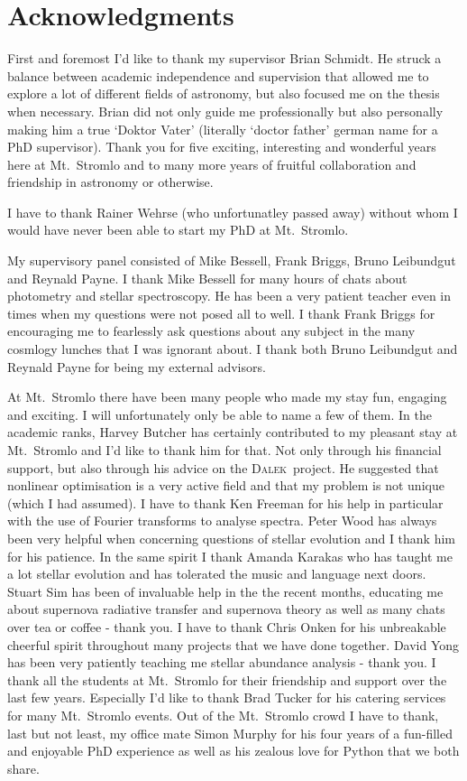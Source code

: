 \section*{Acknowledgments}

First and foremost I'd like to thank my supervisor Brian Schmidt. He struck a balance between academic independence and supervision that allowed me to explore a lot of different fields of astronomy, but also focused me on the thesis when necessary. Brian did not only guide me professionally but also personally making him a true `Doktor Vater' (literally `doctor father' german name for a PhD supervisor). Thank you for five exciting, interesting and wonderful years here at Mt.~Stromlo and to many more years of fruitful collaboration and friendship in astronomy or otherwise.

I have to thank Rainer Wehrse (who unfortunatley passed away) without whom I would have never been able to start my PhD at Mt.~Stromlo.

My supervisory panel consisted of Mike Bessell, Frank Briggs, Bruno Leibundgut and Reynald Payne.
I thank Mike Bessell for many hours of chats about photometry and stellar spectroscopy. He has been a very patient teacher even in times when my questions were not posed all to well.  
I thank Frank Briggs for encouraging me to fearlessly ask questions about any subject in the many cosmlogy lunches that I was ignorant about. 
I thank both Bruno Leibundgut and Reynald Payne for being my external advisors. 

At Mt.~Stromlo there have been many people who made my stay fun, engaging and exciting. I will unfortunately only be able to name a few of them.
In the academic ranks, Harvey Butcher has certainly contributed to my pleasant stay at Mt.~Stromlo and I'd like to thank him for that. Not only through his financial support, but also through his advice on the \textsc{Dalek}~project. He suggested that nonlinear optimisation is a very active field and that my problem is not unique (which I had assumed). 
I have to thank Ken Freeman for his help in particular with the use of Fourier transforms to analyse spectra. 
Peter Wood has always been very helpful when concerning questions of stellar evolution and I thank him for his patience.
In the same spirit I thank Amanda Karakas who has taught me a lot stellar evolution and has tolerated the music and language next doors.
Stuart Sim has been of invaluable help in the the recent months, educating me about supernova radiative transfer and supernova theory as well as many chats over tea or coffee - thank you.
I have to thank Chris Onken for his unbreakable cheerful spirit throughout many projects that we have done together.
David Yong has been very patiently teaching me stellar abundance analysis - thank you.
I thank all the students at Mt.~Stromlo for their friendship and support over the last few years. Especially I'd like to thank Brad Tucker for his catering services for many Mt.~Stromlo events. 
Out of the Mt.~Stromlo crowd I have to thank, last but not least, my office mate Simon Murphy for his four years of a fun-filled and enjoyable PhD experience as well as his zealous love for Python that we both share.

